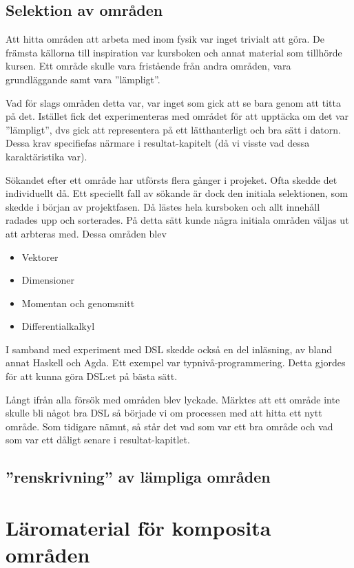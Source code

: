 \begin{binge}
\subsection{Selektion av områden}

Att hitta områden att arbeta med inom fysik var inget trivialt att göra. De främsta källorna till inspiration var kursboken och annat material som tillhörde kursen. Ett område skulle vara fristående från andra områden, vara grundläggande samt vara ''lämpligt''.

Vad för slags områden detta var, var inget som gick att se bara genom att titta på det. Istället fick det experimenteras med området för att upptäcka om det var ''lämpligt'', dvs gick att representera på ett lätthanterligt och bra sätt i datorn. Dessa krav specifiefas närmare i resultat-kapitelt (då vi visste vad dessa karaktäristika var).

Sökandet efter ett område har utförsts flera gånger i projeket. Ofta skedde det individuellt då. Ett speciellt fall av sökande är dock den initiala selektionen, som skedde i början av projektfasen. Då lästes hela kursboken och allt innehåll radades upp och sorterades. På detta sätt kunde några initiala områden väljas ut att arbteras med. Dessa områden blev

\begin{itemize}
  \item Vektorer
  \item Dimensioner
  \item Momentan och genomsnitt
  \item Differentialkalkyl
\end{itemize}

I samband med experiment med DSL skedde också en del inläsning, av bland annat Haskell och Agda. Ett exempel var typnivå-programmering. Detta gjordes för att kunna göra DSL:et på bästa sätt.

Långt ifrån alla försök med områden blev lyckade. Märktes att ett område inte skulle bli något bra DSL så började vi om processen med att hitta ett nytt område. Som tidigare nämnt, så står det vad som var ett bra område och vad som var ett dåligt senare i resultat-kapitlet.

\subsection{''renskrivning'' av lämpliga områden}

\section{Läromaterial för komposita områden}


\end{binge}
